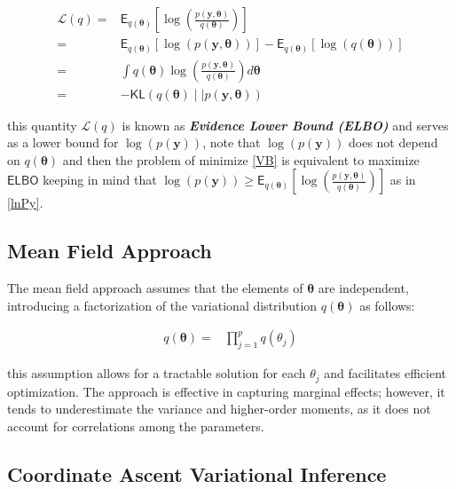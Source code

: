 \begin{equation}
\label{ELBO}
\begin{split}
    \mathcal{L}(q) =&\mathsf{E}_{q(\bm{\theta})}\left[ \log \left(\frac{p(\bm{y},\bm{\theta})}{q(\bm{\theta})}\right)\right]\\
    =&\mathsf{E}_{q(\bm{\theta})}\left[\log (p(\bm{y},\bm{\theta})) \right]-\mathsf{E}_{q(\bm{\theta})}\left[\log (q(\bm{\theta}) )\right]\\
    =&\int q(\bm{\theta}) \log \left(\frac{p(\bm{y},\bm{\theta})}{q(\bm{\theta})}\right)d\bm{\theta}\\
    =&-\mathsf{KL}\left(q(\bm{\theta})\mid\mid p(\bm{y},\bm{\theta})\right)
\end{split}
\end{equation}

this quantity $\mathcal{L}(q)$ is known as \textbf{\textit{Evidence Lower Bound (ELBO)}} and serves as a lower bound for $\log{(p(\bm{y}))}$, note that $\log({p(\bm{y})})$ does not depend on $q(\bm{\theta})$ and then the problem of minimize \ref{VB} is equivalent to maximize $\mathsf{ELBO}$ keeping in mind that $\log({p(\bm{y})})\geq \mathsf{E}_{q(\bm{\theta})}\left[ \log \left(\frac{p(\bm{y},\bm{\theta})}{q(\bm{\theta})}\right)\right]$ as in \ref{lnPy}.


\subsection{Mean Field Approach}

The mean field approach assumes that the elements of $\bm{\theta}$ are independent, introducing a factorization of the variational distribution $q(\bm{\theta})$ as follows:

\begin{equation}
\label{MFA}
\begin{split}
       q(\bm{\theta})
       =&\prod_{j=1}^{p}q\left(\theta_j\right) 
\end{split}
\end{equation}

this assumption allows for a tractable solution for each $\theta_j$ and facilitates efficient optimization. The approach is effective in capturing marginal effects; however, it tends to underestimate the variance and higher-order moments, as it does not account for correlations among the parameters.

\subsection {Coordinate Ascent Variational Inference}

